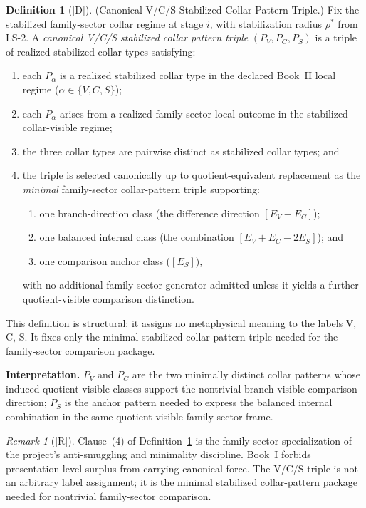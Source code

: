 \documentclass[12pt,oneside]{amsbook}
\theoremstyle{plain}
\theoremstyle{definition}
\newtheorem{definition}[theorem]{Definition}
\theoremstyle{remark}
\newtheorem{remark}[theorem]{Remark}
\newcommand{\status}[1]{\textup{[#1]}}
\begin{document}
\begin{definition}[\status{D}]\label{def:vcs-pattern-triple}
\textup{(Canonical V/C/S Stabilized Collar Pattern Triple.)}
Fix the stabilized family-sector collar regime at stage $i$, with
stabilization radius $\rho^*$ from LS-2.  A
\emph{canonical V/C/S stabilized collar pattern triple}
$(P_V, P_C, P_S)$ is a triple of realized stabilized collar types
satisfying:
\begin{enumerate}[label=\textup{(\arabic*)}]
  \item each $P_\alpha$ is a realized stabilized collar type in the
    declared Book~II local regime ($\alpha \in \{V,C,S\}$);
  \item each $P_\alpha$ arises from a realized family-sector local
    outcome in the stabilized collar-visible regime;
  \item the three collar types are pairwise distinct as stabilized
    collar types; and
  \item the triple is selected canonically up to quotient-equivalent
    replacement as the \emph{minimal} family-sector collar-pattern
    triple supporting:
    \begin{enumerate}[label=\textup{(\alph*)}]
      \item one branch-direction class (the difference direction
        $[E_V - E_C]$);
      \item one balanced internal class (the combination
        $[E_V + E_C - 2E_S]$); and
      \item one comparison anchor class ($[E_S]$),
    \end{enumerate}
    with no additional family-sector generator admitted unless it
    yields a further quotient-visible comparison distinction.
\end{enumerate}
This definition is structural: it assigns no metaphysical meaning to
the labels V, C, S.  It fixes only the minimal stabilized
collar-pattern triple needed for the family-sector comparison package.

\textbf{Interpretation.}  $P_V$ and $P_C$ are the two minimally
distinct collar patterns whose induced quotient-visible classes
support the nontrivial branch-visible comparison direction; $P_S$ is
the anchor pattern needed to express the balanced internal combination
in the same quotient-visible family-sector frame.
\end{definition}

\begin{remark}[\status{R}]\label{rem:vcs-minimality}
Clause~(4) of Definition~\ref{def:vcs-pattern-triple} is the
family-sector specialization of the project's anti-smuggling and
minimality discipline.  Book~I forbids presentation-level surplus from
carrying canonical force.  The V/C/S triple is not an arbitrary label
assignment; it is the minimal stabilized collar-pattern package needed
for nontrivial family-sector comparison.
\end{remark}
\end{document}
